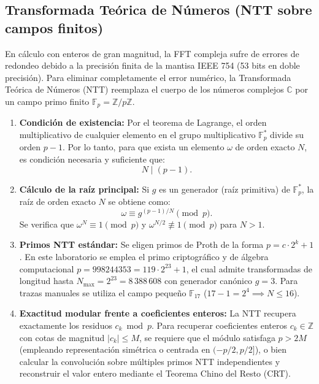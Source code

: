 \subsection{Transformada Teórica de Números (NTT sobre campos finitos)}
En cálculo con enteros de gran magnitud, la FFT compleja sufre de errores de redondeo debido a la precisión finita de la mantisa IEEE 754 (53 bits en doble precisión). Para eliminar completamente el error numérico, la Transformada Teórica de Números (NTT) reemplaza el cuerpo de los números complejos $\mathbb{C}$ por un campo primo finito $\mathbb{F}_p = \mathbb{Z}/p\mathbb{Z}$.
\begin{enumerate}
    \item \textbf{Condición de existencia:} Por el teorema de Lagrange, el orden multiplicativo de cualquier elemento en el grupo multiplicativo $\mathbb{F}_p^*$ divide su orden $p-1$. Por lo tanto, para que exista un elemento $\omega$ de orden exacto $N$, es condición necesaria y suficiente que:
    \begin{equation}
    N \mid (p - 1).
    \end{equation}
    \item \textbf{Cálculo de la raíz principal:} Si $g$ es un generador (raíz primitiva) de $\mathbb{F}_p^*$, la raíz de orden exacto $N$ se obtiene como:
    \begin{equation}
    \omega \equiv g^{(p-1)/N} \pmod p.
    \end{equation}
    Se verifica que $\omega^N \equiv 1 \pmod p$ y $\omega^{N/2} \not\equiv 1 \pmod p$ para $N > 1$.
    \item \textbf{Primos NTT estándar:} Se eligen primos de Proth de la forma $p = c \cdot 2^k + 1$. En este laboratorio se emplea el primo criptográfico y de álgebra computacional $p = 998244353 = 119 \cdot 2^{23} + 1$, el cual admite transformadas de longitud hasta $N_{\max} = 2^{23} = 8\,388\,608$ con generador canónico $g = 3$. Para trazas manuales se utiliza el campo pequeño $\mathbb{F}_{17}$ ($17 - 1 = 2^4 \implies N \le 16$).
    \item \textbf{Exactitud modular frente a coeficientes enteros:} La NTT recupera exactamente los residuos $c_k \bmod p$. Para recuperar coeficientes enteros $c_k \in \mathbb{Z}$ con cotas de magnitud $|c_k| \le M$, se requiere que el módulo satisfaga $p > 2M$ (empleando representación simétrica o centrada en $(-p/2, p/2]$), o bien calcular la convolución sobre múltiples primos NTT independientes y reconstruir el valor entero mediante el Teorema Chino del Resto (CRT).
\end{enumerate}
